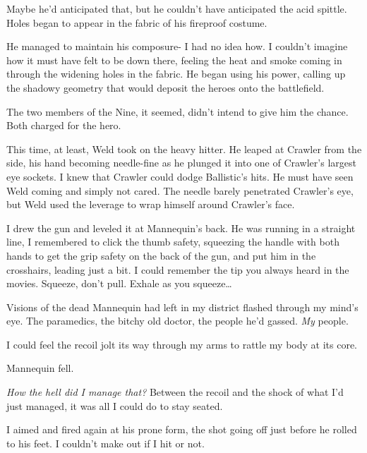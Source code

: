 Maybe he'd anticipated that, but he couldn't have anticipated the acid spittle.  Holes began to appear in the fabric of his fireproof costume.



He managed to maintain his composure- I had no idea how.  I couldn't imagine how it must have felt to be down there, feeling the heat and smoke coming in through the widening holes in the fabric.  He began using his power, calling up the shadowy geometry that would deposit the heroes onto the battlefield.



The two members of the Nine, it seemed, didn't intend to give him the chance.  Both charged for the hero.



This time, at least, Weld took on the heavy hitter.  He leaped at Crawler from the side, his hand becoming needle-fine as he plunged it into one of Crawler's largest eye sockets.  I knew that Crawler could dodge Ballistic's hits.  He must have seen Weld coming and simply not cared.  The needle barely penetrated Crawler's eye, but Weld used the leverage to wrap himself around Crawler's face.



I drew the gun and leveled it at Mannequin's back.  He was running in a straight line, I remembered to click the thumb safety, squeezing the handle with both hands to get the grip safety on the back of the gun, and put him in the crosshairs, leading just a bit.  I could remember the tip you always heard in the movies.  Squeeze, don't pull.  Exhale as you squeeze\ldots



Visions of the dead Mannequin had left in my district flashed through my mind's eye.  The paramedics, the bitchy old doctor, the people he'd gassed.  \emph{My} people.



I could feel the recoil jolt its way through my arms to rattle my body at its core.



Mannequin fell.



\emph{How the hell did I manage that?  }Between the recoil and the shock of what I'd just managed, it was all I could do to stay seated.



I aimed and fired again at his prone form, the shot going off just before he rolled to his feet.  I couldn't make out if I hit or not.



